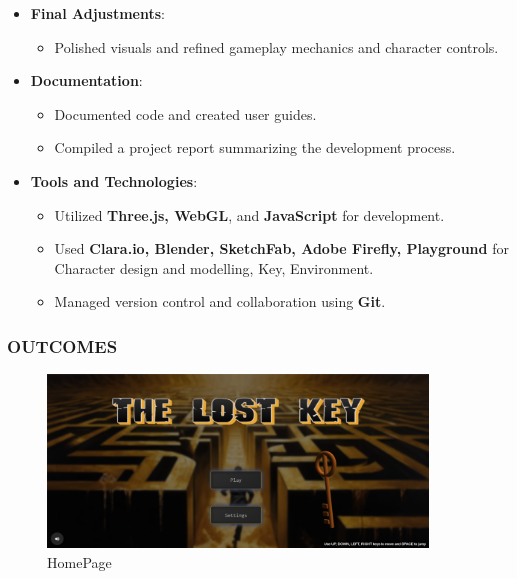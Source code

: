 \documentclass[9pt]{beamer}
\begin{document}
\begin{frame}
    \begin{itemize}
        \item \textbf{Final Adjustments}: 
        \begin{itemize}
            \item Polished visuals and refined gameplay mechanics and character controls.
        \end{itemize}
        \vspace{0.5em}

        \item \textbf{Documentation}: 
        \begin{itemize}
            \item Documented code and created user guides.
            \item Compiled a project report summarizing the development process.
        \end{itemize}
        
        \vspace{0.5em}

        \item \textbf{Tools and Technologies}: 
        \begin{itemize}
            \item Utilized \textbf{Three.js, WebGL}, and \textbf{JavaScript} for development.
            \item Used \textbf{Clara.io, Blender, SketchFab, Adobe Firefly, Playground} for Character design and modelling, Key, Environment.
            \item Managed version control and collaboration using \textbf{Git}.
        \end{itemize}
    \end{itemize}
\end{frame}



\begin{frame}
    \frametitle{OUTCOMES}
    \begin{figure}[h]
        \centering
        \includegraphics[width=0.9\textwidth, height=0.7\textheight]{HomePage.png}
        \caption{HomePage}
    \end{figure}
\end{frame}
\end{document}
